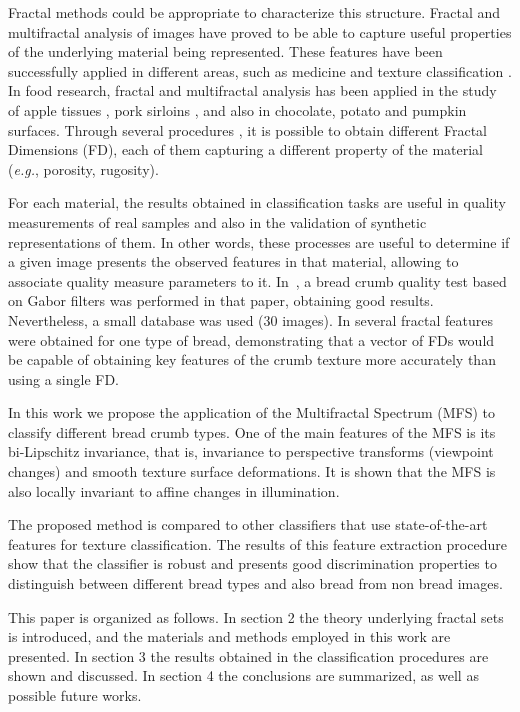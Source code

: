 \documentclass[a4paper,10pt]{article}
\begin{document}
Fractal methods could be appropriate to characterize this structure. Fractal and multifractal analysis of images have proved to be able to capture useful properties of the underlying material being represented. These features have been successfully applied in different areas, such as medicine \cite{Andjelkovic2008,Yu2011} and texture classification \cite{Wendt2009}. In food research, fractal and multifractal analysis has been applied in the study of apple tissues \cite{Mendoza2010}, pork sirloins \cite{Serrano2012}, and also in chocolate, potato and pumpkin surfaces\cite{Quevedo2002}. Through several procedures \cite{Peitgen2004, Gonzales2008}, it is possible to obtain different Fractal Dimensions (FD), each of them capturing a different property of the material ({\em e.g.}, porosity, rugosity).

For each material, the results obtained in classification tasks are useful in quality measurements of real samples and also in the validation of synthetic representations of them. In other words, these processes are useful to determine if a given image presents the observed features in that material, allowing to associate quality measure parameters to it. In~\cite{Fan2006}, a bread crumb quality test based on Gabor filters was performed in that paper, obtaining good results. Nevertheless, a small database was used ($30$ images). In \cite{Gonzales2008} several fractal features were obtained for one type of bread, demonstrating that a vector of FDs would be capable of obtaining key features of the crumb texture more accurately than using a single FD.

In this work we propose the application of the Multifractal Spectrum (MFS) \cite{Xu2006} to classify different bread crumb types. One of the main features of the MFS is its bi-Lipschitz invariance, that is, invariance to perspective transforms (viewpoint changes) and smooth texture surface deformations. It is shown that the MFS is also locally invariant to affine changes in illumination.

The proposed method is compared to other classifiers that use state-of-the-art features for texture classification. The results of this feature extraction procedure show that the classifier is robust and presents good discrimination properties to distinguish between different bread types and also bread from non bread images. 

This paper is organized as follows. In section 2 the theory underlying fractal sets is introduced, and the materials and methods employed in this work are presented. In section 3 the results obtained in the classification procedures are shown and discussed. In section 4 the conclusions are summarized, as well as possible future works.
\end{document}
